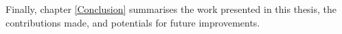 		Finally, chapter \ref{Conclusion} summarises the work presented in this thesis, the contributions made, and potentials for future improvements.
		
%				
%		
%		
%		
%		
		
		
